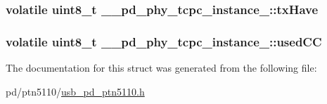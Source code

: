 \hypertarget{struct____pd__phy__tcpc__instance___a2f5f0754a16062bcf9c7572d8c3b5bd7}{
\subsubsection[{tx\-Have}]{\setlength{\rightskip}{0pt plus 5cm}volatile uint8\-\_\-t \-\_\-\-\_\-pd\-\_\-phy\-\_\-tcpc\-\_\-instance\-\_\-\-::tx\-Have}}\label{struct____pd__phy__tcpc__instance___a2f5f0754a16062bcf9c7572d8c3b5bd7}
\hypertarget{struct____pd__phy__tcpc__instance___a411ad2f7bc90a10a62a5ec1f466a4a97}{
\subsubsection[{used\-C\-C}]{\setlength{\rightskip}{0pt plus 5cm}volatile uint8\-\_\-t \-\_\-\-\_\-pd\-\_\-phy\-\_\-tcpc\-\_\-instance\-\_\-\-::used\-C\-C}}\label{struct____pd__phy__tcpc__instance___a411ad2f7bc90a10a62a5ec1f466a4a97}


The documentation for this struct was generated from the following file\-:\begin{DoxyCompactItemize}
\item 
pd/ptn5110/\hyperlink{usb__pd__ptn5110_8h}{usb\-\_\-pd\-\_\-ptn5110.\-h}\end{DoxyCompactItemize}
